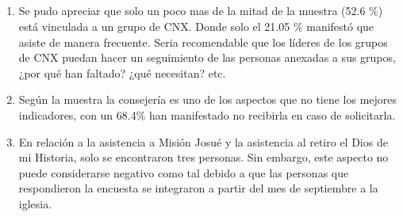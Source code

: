 \documentclass{beamer}
\begin{document}
\subsection{}
\begin{frame}{}
\vspace{-0.9\baselineskip}
\begin{tcolorbox}[colback=backframe_color,colframe=beamer_color,title= Conclusiones] 

\begin{enumerate}
    \item Se pudo apreciar que solo un poco mas de la mitad de la muestra (52.6 \%) está vinculada a un grupo de CNX. Donde solo el 21.05 \% manifestó que asiste de manera frecuente. Seria recomendable que los líderes de los grupos de CNX puedan hacer un seguimiento de las personas anexadas a sus grupos, ¿por qué han faltado? ¿qué necesitan? etc.
    \item Según la muestra la consejería es uno de los aspectos que no tiene los mejores indicadores, con un 68.4\%  han manifestado no recibirla en caso de solicitarla. 
    \item En relación a la asistencia a Misión Josué y la asistencia al retiro el Dios de mi Historia, solo se encontraron tres personas. Sin embargo, este aspecto no puede considerarse negativo como tal debido a que las personas que respondieron la encuesta se integraron a partir del mes de septiembre a la iglesia.  
\end{enumerate}
\end{tcolorbox}
\end{frame}





\end{document}
